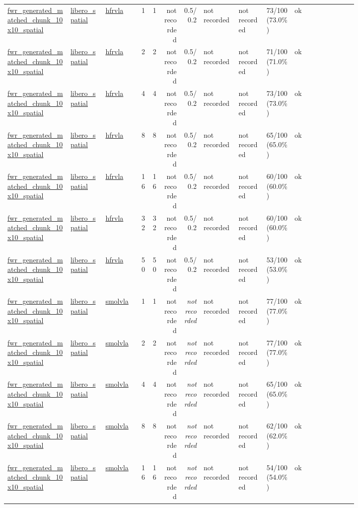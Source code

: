 \begin{tiny}
\begin{longtable}{@{}p{0.18\linewidth}p{0.10\linewidth}p{0.10\linewidth}rrrrp{0.10\linewidth}p{0.08\linewidth}p{0.08\linewidth}p{0.11\linewidth}p{0.07\linewidth}@{}}
\url{fwr_generated_matched_chunk_10x10_spatial} & \url{libero_spatial} & \url{hfrvla} & 1 & 1 & not recorded & 0.5/0.2 & not recorded & not recorded & 73/100 (73.0\%) & ok \\
\url{fwr_generated_matched_chunk_10x10_spatial} & \url{libero_spatial} & \url{hfrvla} & 2 & 2 & not recorded & 0.5/0.2 & not recorded & not recorded & 71/100 (71.0\%) & ok \\
\url{fwr_generated_matched_chunk_10x10_spatial} & \url{libero_spatial} & \url{hfrvla} & 4 & 4 & not recorded & 0.5/0.2 & not recorded & not recorded & 73/100 (73.0\%) & ok \\
\url{fwr_generated_matched_chunk_10x10_spatial} & \url{libero_spatial} & \url{hfrvla} & 8 & 8 & not recorded & 0.5/0.2 & not recorded & not recorded & 65/100 (65.0\%) & ok \\
\url{fwr_generated_matched_chunk_10x10_spatial} & \url{libero_spatial} & \url{hfrvla} & 16 & 16 & not recorded & 0.5/0.2 & not recorded & not recorded & 60/100 (60.0\%) & ok \\
\url{fwr_generated_matched_chunk_10x10_spatial} & \url{libero_spatial} & \url{hfrvla} & 32 & 32 & not recorded & 0.5/0.2 & not recorded & not recorded & 60/100 (60.0\%) & ok \\
\url{fwr_generated_matched_chunk_10x10_spatial} & \url{libero_spatial} & \url{hfrvla} & 50 & 50 & not recorded & 0.5/0.2 & not recorded & not recorded & 53/100 (53.0\%) & ok \\
\url{fwr_generated_matched_chunk_10x10_spatial} & \url{libero_spatial} & \url{smolvla} & 1 & 1 & not recorded & \emph{not recorded} & not recorded & not recorded & 77/100 (77.0\%) & ok \\
\url{fwr_generated_matched_chunk_10x10_spatial} & \url{libero_spatial} & \url{smolvla} & 2 & 2 & not recorded & \emph{not recorded} & not recorded & not recorded & 77/100 (77.0\%) & ok \\
\url{fwr_generated_matched_chunk_10x10_spatial} & \url{libero_spatial} & \url{smolvla} & 4 & 4 & not recorded & \emph{not recorded} & not recorded & not recorded & 65/100 (65.0\%) & ok \\
\url{fwr_generated_matched_chunk_10x10_spatial} & \url{libero_spatial} & \url{smolvla} & 8 & 8 & not recorded & \emph{not recorded} & not recorded & not recorded & 62/100 (62.0\%) & ok \\
\url{fwr_generated_matched_chunk_10x10_spatial} & \url{libero_spatial} & \url{smolvla} & 16 & 16 & not recorded & \emph{not recorded} & not recorded & not recorded & 54/100 (54.0\%) & ok \\

\end{longtable}
\end{tiny}
